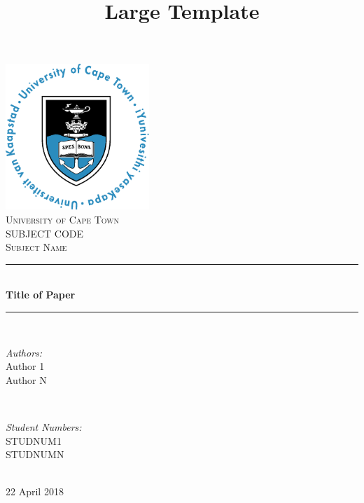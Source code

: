 \title{Large Template}

\begin{titlepage}
  \centering
  \vspace*{0.5 cm}
  \includegraphics[height=2.167in]{Figures/UCT_Circular}\\[1 cm]  %
  \textsc{\LARGE University of Cape Town}\\[2.0 cm]  %
  \textsc{\Large SUBJECT CODE}\\[0.5 cm]        %
  \textsc{\large Subject Name}\\[0.5 cm]        %
  \rule{\linewidth}{0.2 mm} \\[0.4 cm]
  { \huge \bfseries Title of Paper}\\
  \rule{\linewidth}{0.2 mm} \\[1.5 cm]

  \begin{minipage}{0.4\textwidth}
    \begin{flushleft} \large
      \emph{Authors:}\\
      Author 1\\
      Author N
    \end{flushleft}
    \end{minipage}~
  \begin{minipage}{0.4\textwidth}
    \begin{flushright} \large
      \emph{Student Numbers:} \\
      STUDNUM1\\
      STUDNUMN
    \end{flushright}
  \end{minipage}\\[2 cm]

  {\large 22 April 2018}\\[2 cm]

\vfill

\end{titlepage}

